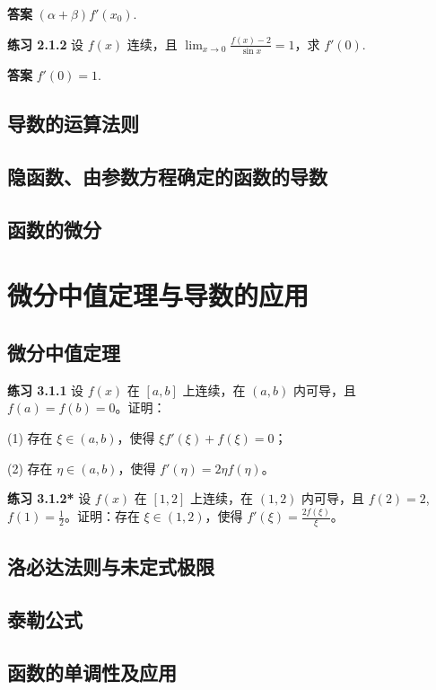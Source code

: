 \documentclass[lang=cn,10pt]{elegantbook}
\begin{document}
\textbf{答案} $(\alpha + \beta) f'(x_0)$.


\textbf{练习 2.1.2} 设 $f(x)$ 连续，且 $\lim_{x \to 0} \frac{f(x) - 2}{\sin x} = 1$，求 $f'(0)$.

\textbf{答案} $f'(0) = 1$.
\section{导数的运算法则}

\section{隐函数、由参数方程确定的函数的导数}



\section{函数的微分}





\chapter{微分中值定理与导数的应用}
\section{微分中值定理}
\textbf{练习 3.1.1} 设 $f(x)$ 在 $[a,b]$ 上连续，在 $(a,b)$ 内可导，且 $f(a) = f(b) = 0$。证明：

(1) 存在 $\xi \in (a,b)$，使得 $\xi f'(\xi) + f(\xi) = 0$；

(2) 存在 $\eta \in (a,b)$，使得 $f'(\eta) = 2\eta f(\eta)$。


\textbf{练习 3.1.2*} 设 $f(x)$ 在 $[1,2]$ 上连续，在 $(1,2)$ 内可导，且 $f(2) = 2$, $f(1) = \frac{1}{2}$。证明：存在 $\xi \in (1,2)$，使得 $f'(\xi) = \frac{2f(\xi)}{\xi}$。
\section{洛必达法则与未定式极限}


\section{泰勒公式}

\section{函数的单调性及应用}
\end{document}
